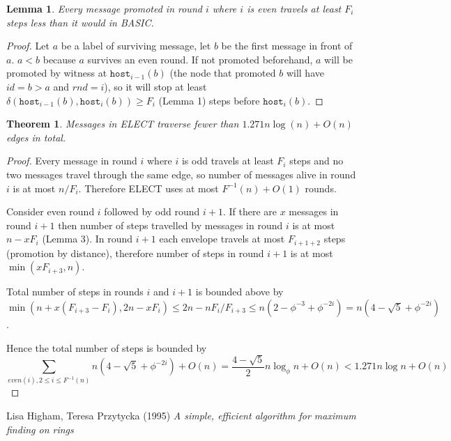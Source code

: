 \documentclass{article}
\newtheorem{lemma}{Lemma}
\newtheorem{theorem}{Theorem}
\begin{document}
\begin{lemma}
Every message promoted in round $i$ where $i$ is even travels at least $F_i$ steps less than it would in BASIC.
\end{lemma}


\begin{proof}
Let $a$ be a label of surviving message, let $b$ be the first message in front of $a$. $a < b$ because $a$ survives an even round. If not promoted beforehand, $a$ will be promoted by witness at $\texttt{host}_{i-1}(b)$ (the node that promoted $b$ will have $id = b > a$ and $rnd = i$), so it will stop at least $\delta(\texttt{host}_{i-1}(b), \texttt{host}_i(b)) \geq F_i$ (Lemma 1) steps before $\texttt{host}_i(b)$.
\end{proof}

\begin{theorem}
Messages in ELECT traverse fewer than $1.271n\log(n) + O(n)$ edges in total.
\end{theorem}
\begin{proof}
Every message in round $i$ where $i$ is odd travels at least $F_i$ steps and no two messages travel through the same edge, so number of messages alive in round $i$ is at most $n/F_i$. Therefore ELECT uses at most $F^{-1}(n) + O(1)$ rounds.

Consider even round $i$ followed by odd round $i + 1$. If there are $x$ messages in round $i + 1$ then number of steps travelled by messages in round $i$ is at most $n - xF_i$ (Lemma 3). In round $i+1$ each envelope travels at most $F_{i+1+2}$ steps (promotion by distance), therefore number of steps in round $i+1$ is at most $\min(xF_{i+3}, n)$.

Total number of steps in rounds $i$ and $i+1$ is bounded above by $\min(n+x(F_{i+3} - F_i), 2n - xF_i) \leq 2n - nF_i/F_{i+3} \leq n(2 - \phi^{-3} + \phi^{-2i}) = n(4 - \sqrt{5} + \phi^{-2i})$.

Hence the total number of steps is bounded by
$$\sum_{even(i), 2\leq i \leq F^{-1}(n)} n(4-\sqrt{5} + \phi^{-2i}) + O(n) = \frac{4 - \sqrt{5}}{2}n\log_\phi n + O(n) < 1.271n\log n + O(n)$$
\end{proof}

\begin{thebibliography}{9}
 Lisa Higham, Teresa Przytycka (1995) \emph{A simple, efficient algorithm for maximum finding on rings}
\end{thebibliography}
\end{document}
